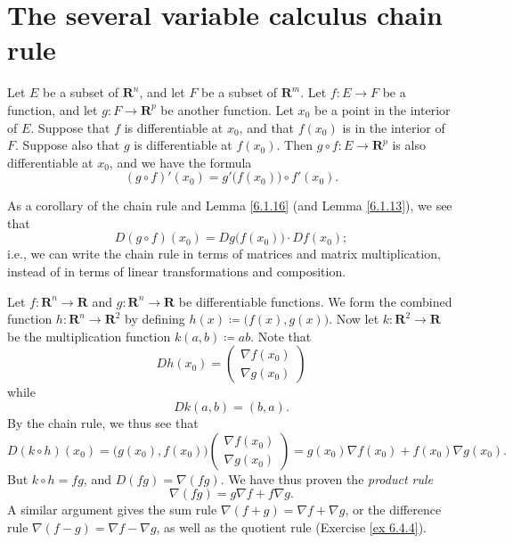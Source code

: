 \section{The several variable calculus chain rule}\label{sec 6.4}

\begin{theorem}\label{6.4.1}
    Let \(E\) be a subset of \(\mathbf{R}^n\), and let \(F\) be a subset of \(\mathbf{R}^m\).
    Let \(f : E \to F\) be a function, and let \(g : F \to \mathbf{R}^p\) be another function.
    Let \(x_0\) be a point in the interior of \(E\).
    Suppose that \(f\) is differentiable at \(x_0\), and that \(f(x_0)\) is in the interior of \(F\).
    Suppose also that \(g\) is differentiable at \(f(x_0)\).
    Then \(g \circ f : E \to \mathbf{R}^p\) is also differentiable at \(x_0\), and we have the formula
    \[
        (g \circ f)'(x_0) = g'\big(f(x_0)\big) \circ f'(x_0).
    \]
\end{theorem}

\begin{note}
    As a corollary of the chain rule and Lemma \ref{6.1.16} (and Lemma \ref{6.1.13}), we see that
    \[
        D (g \circ f)(x_0) = D g\big(f(x_0)\big) \cdot D f(x_0);
    \]
    i.e., we can write the chain rule in terms of matrices and matrix multiplication, instead of in terms of linear transformations and composition.
\end{note}

\begin{example}\label{6.4.2}
    Let \(f : \mathbf{R}^n \to \mathbf{R}\) and \(g : \mathbf{R}^n \to \mathbf{R}\) be differentiable functions.
    We form the combined function \(h : \mathbf{R}^n \to \mathbf{R}^2\) by defining \(h(x) \coloneqq \big(f(x), g(x)\big)\).
    Now let \(k : \mathbf{R}^2 \to \mathbf{R}\) be the multiplication function \(k(a, b) \coloneqq ab\).
    Note that
    \[
        D h(x_0) = \begin{pmatrix}
            \nabla f(x_0) \\
            \nabla g(x_0)
        \end{pmatrix}
    \]
    while
    \[
        D k(a, b) = (b, a).
    \]
    By the chain rule, we thus see that
    \[
        D (k \circ h)(x_0) = \big(g(x_0), f(x_0)\big) \begin{pmatrix}
            \nabla f(x_0) \\
            \nabla g(x_0)
        \end{pmatrix} = g(x_0) \nabla f(x_0) + f(x_0) \nabla g(x_0).
    \]
    But \(k \circ h = fg\), and \(D (fg) = \nabla (fg)\).
    We have thus proven the \emph{product rule}
    \[
        \nabla (fg) = g \nabla f + f \nabla g.
    \]
    A similar argument gives the sum rule \(\nabla (f + g) = \nabla f + \nabla g\), or the difference rule \(\nabla (f - g) = \nabla f - \nabla g\), as well as the quotient rule (Exercise \ref{ex 6.4.4}).
\end{example}

